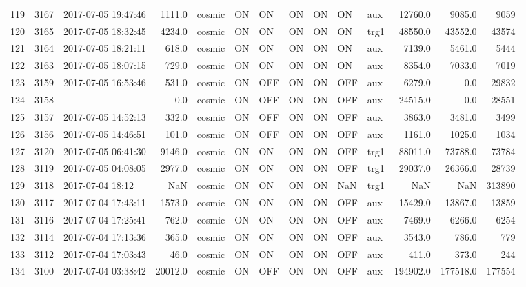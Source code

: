 \begin{tabular}{lrlrlllllllrrr}
119 &  3167 &  2017-07-05 19:47:46 &    1111.0 &   cosmic &  ON &   ON &   ON &  ON &   ON &       aux &     12760.0 &       9085.0 &                9059 \\
120 &  3165 &  2017-07-05 18:32:45 &    4234.0 &   cosmic &  ON &   ON &   ON &  ON &   ON &      trg1 &     48550.0 &      43552.0 &               43574 \\
121 &  3164 &  2017-07-05 18:21:11 &     618.0 &   cosmic &  ON &   ON &   ON &  ON &   ON &       aux &      7139.0 &       5461.0 &                5444 \\
122 &  3163 &  2017-07-05 18:07:15 &     729.0 &   cosmic &  ON &   ON &   ON &  ON &   ON &       aux &      8354.0 &       7033.0 &                7019 \\
123 &  3159 &  2017-07-05 16:53:46 &     531.0 &   cosmic &  ON &  OFF &   ON &  ON &  OFF &       aux &      6279.0 &          0.0 &               29832 \\
124 &  3158 &                  --- &       0.0 &   cosmic &  ON &  OFF &   ON &  ON &  OFF &       aux &     24515.0 &          0.0 &               28551 \\
125 &  3157 &  2017-07-05 14:52:13 &     332.0 &   cosmic &  ON &  OFF &   ON &  ON &  OFF &       aux &      3863.0 &       3481.0 &                3499 \\
126 &  3156 &  2017-07-05 14:46:51 &     101.0 &   cosmic &  ON &  OFF &   ON &  ON &  OFF &       aux &      1161.0 &       1025.0 &                1034 \\
127 &  3120 &  2017-07-05 06:41:30 &    9146.0 &   cosmic &  ON &   ON &   ON &  ON &  OFF &      trg1 &     88011.0 &      73788.0 &               73784 \\
128 &  3119 &  2017-07-05 04:08:05 &    2977.0 &   cosmic &  ON &   ON &   ON &  ON &  OFF &      trg1 &     29037.0 &      26366.0 &               28739 \\
129 &  3118 &     2017-07-04 18:12 &       NaN &   cosmic &  ON &   ON &   ON &  ON &  NaN &      trg1 &         NaN &          NaN &              313890 \\
130 &  3117 &  2017-07-04 17:43:11 &    1573.0 &   cosmic &  ON &   ON &   ON &  ON &  OFF &       aux &     15429.0 &      13867.0 &               13859 \\
131 &  3116 &  2017-07-04 17:25:41 &     762.0 &   cosmic &  ON &   ON &   ON &  ON &  OFF &       aux &      7469.0 &       6266.0 &                6254 \\
132 &  3114 &  2017-07-04 17:13:36 &     365.0 &   cosmic &  ON &   ON &   ON &  ON &  OFF &       aux &      3543.0 &        786.0 &                 779 \\
133 &  3112 &  2017-07-04 17:03:43 &      46.0 &   cosmic &  ON &   ON &   ON &  ON &  OFF &       aux &       411.0 &        373.0 &                 244 \\
134 &  3100 &  2017-07-04 03:38:42 &   20012.0 &   cosmic &  ON &  OFF &   ON &  ON &  OFF &       aux &    194902.0 &     177518.0 &              177554 \\
\bottomrule
\end{tabular}
